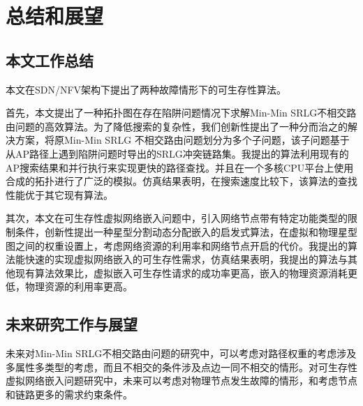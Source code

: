 
\chapter{总结和展望}
\section{本文工作总结}
本文在SDN/NFV架构下提出了两种故障情形下的可生存性算法。

首先，本文提出了一种拓扑图在存在陷阱问题情况下求解Min-Min SRLG不相交路由问题的高效算法。为了降低搜索的复杂性，我们创新性提出了一种分而治之的解决方案，将原Min-Min SRLG 不相交路由问题划分为多个子问题，该子问题基于从AP路径上遇到陷阱问题时导出的SRLG冲突链路集。我提出的算法利用现有的AP搜索结果和并行执行来实现更快的路径查找。并且在一个多核CPU平台上使用合成的拓扑进行了广泛的模拟。仿真结果表明，在搜索速度比较下，该算法的查找性能优于其它现有算法。

其次，本文在可生存性虚拟网络嵌入问题中，引入网络节点带有特定功能类型的限制条件，创新性提出一种星型分割动态分配嵌入的启发式算法，在虚拟和物理星型图之间的权重设置上，考虑网络资源的利用率和网络节点开启的代价。我提出的算法能快速的实现虚拟网络嵌入的可生存性需求，仿真结果表明，我提出的算法与其他现有算法效果比，虚拟嵌入可生存性请求的成功率更高，嵌入的物理资源消耗更低，物理资源的利用率更高。

\section{未来研究工作与展望}
未来对Min-Min SRLG不相交路由问题的研究中，可以考虑对路径权重的考虑涉及多属性多类型的考虑，而且不相交的条件涉及点边一同不相交的情形。对可生存性虚拟网络嵌入问题研究中，未来可以考虑对物理节点发生故障的情形，和考虑节点和链路更多的需求约束条件。
